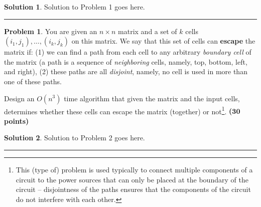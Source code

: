 \documentclass{article}
\theoremstyle{definition}
\newtheorem{problem}{Problem}
\def\fline{\rule{0.75\linewidth}{0.5pt}}
\newcommand{\finishline}{\begin{center}\fline\end{center}}
\newtheorem*{solution*}{Solution}
\newenvironment{solution}{\begin{solution*}}{{\finishline} \end{solution*}}
\newcommand{\grade}[1]{\hfill{\textbf{($\mathbf{#1}$ points)}}}
\begin{document}
\bigskip

\begin{solution}
	Solution to Problem 1 goes here. 
\end{solution}
\bigskip

\begin{problem}
	You are given an $n \times n$ matrix and a set of $k$ cells $(i_1,j_1),\ldots,(i_k,j_k)$ on this matrix. We say that this set of cells can \textbf{escape} the matrix if: (1) we can find a path from each cell to any arbitrary \emph{boundary cell} of the matrix 
	(a path is a sequence of \emph{neighboring} cells, namely, top, bottom, left, and right), (2) these paths are all \emph{disjoint},  namely, no cell is used in more than one of these paths. 

Design an $O(n^3)$ time algorithm that given the matrix and the input cells, determines whether these cells can escape the matrix (together) or not\footnote{This (type of) problem is used typically to connect multiple components of a circuit to the power sources that can only be placed at the boundary of the circuit -- disjointness of the paths ensures that the components of the circuit do not interfere with each other.}.
\grade{30}

\end{problem}


\bigskip

\begin{solution}
	Solution to Problem 2 goes here. 
\end{solution}

\bigskip
\end{document}
